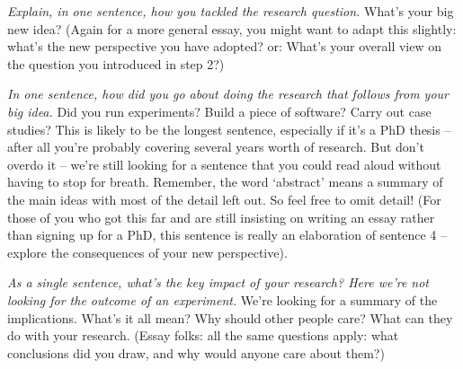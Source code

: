 \documentclass[
  numbers=noenddot,
  english,  %
  a4paper,  %
  twoside,  %
  bibliography=totoc,
  headsepline,
  cleardoublepage=empty,
  parskip=half,
  draft=false
]{scrbook}
\theoremstyle{break}
\begin{document}
\emph{Explain, in one sentence, how you tackled the research question.}
What’s your big new idea?
(Again for a more general essay, you might want to adapt this slightly: what’s the new perspective you have adopted? or:
What’s your overall view on the question you introduced in step 2?)

\emph{In one sentence, how did you go about doing the research that follows from your big idea.}
Did you run experiments?
Build a piece of software?
Carry out case studies?
This is likely to be the longest sentence, especially if it’s a PhD thesis – after all you’re probably covering several years worth of research.
But don’t overdo it – we’re still looking for a sentence that you could read aloud without having to stop for breath.
Remember, the word ‘abstract’ means a summary of the main ideas with most of the detail left out.
So feel free to omit detail!
(For those of you who got this far and are still insisting on writing an essay rather than signing up for a PhD, this sentence is really an elaboration of sentence 4 – explore the consequences of your new perspective).

\emph{As a single sentence, what’s the key impact of your research?
  Here we’re not looking for the outcome of an experiment.
}
We’re looking for a summary of the implications.
What’s it all mean?
Why should other people care?
What can they do with your research.
(Essay folks: all the same questions apply: what conclusions did you draw, and why would anyone care about them?)



%
%
\tableofcontents

\listoffigures

\listoftables

\lstlistoflistings

\end{document}
